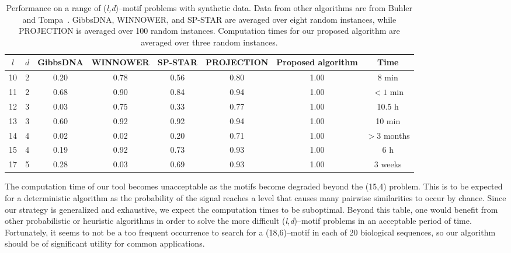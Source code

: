 \begin{table}
\caption[Performance on a range of (\textit{l,d})--motif problems with synthetic data]{Performance on a range of (\textit{l,d})--motif problems with synthetic data.
Data from other algorithms are from
Buhler and Tompa~\cite{buhler2002finding}.  GibbsDNA, WINNOWER, and SP-STAR are averaged over
eight random instances, while PROJECTION is averaged over 100 random instances.  Computation
times for our proposed algorithm are averaged over three random instances.}
\label{table:performance}
\begin{center}
\begin{tabular}{cc|cccc|cc} \hline
$l$ & $d$   & GibbsDNA & WINNOWER & SP-STAR & PROJECTION & Proposed algorithm & Time\\ \hline
10  & 2 & 0.20  & 0.78  & 0.56  & 0.80  & 1.00  & 8 min\\
11  & 2 & 0.68  & 0.90  & 0.84  & 0.94  & 1.00  & $\lt1$ min\\
12  & 3 & 0.03  & 0.75  & 0.33  & 0.77  & 1.00  & 10.5 h\\
13  & 3 & 0.60  & 0.92  & 0.92  & 0.94  & 1.00  & 10 min\\
14  & 4 & 0.02  & 0.02  & 0.20  & 0.71  & 1.00  & $\gt3$ months\\
15  & 4 & 0.19  & 0.92  & 0.73  & 0.93  & 1.00  & 6 h\\
17  & 5 & 0.28  & 0.03  & 0.69  & 0.93  & 1.00  & 3 weeks\\ \hline
\end{tabular}
\end{center}
\end{table}

    The computation time of our tool becomes unacceptable
    as the motifs become degraded beyond the (15,4) problem.  This is to be
    expected for a deterministic algorithm as the probability of the signal
    reaches a level that causes many pairwise similarities to occur by chance.
    Since our strategy is generalized and exhaustive,
    we expect the computation times to be suboptimal.  Beyond this table,
    one would benefit from other probabilistic or heuristic algorithms in order
    to solve the more difficult (\textit{l,d})--motif problems in an acceptable
    period of time.  Fortunately, it seems to not be a too frequent occurrence to
    search for a (18,6)--motif in each of 20 biological sequences, so our algorithm
    should be of significant utility for common applications.

